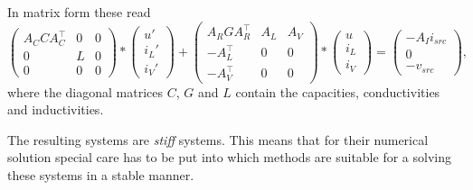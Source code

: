 In matrix form these read
\begin{equation}
	\label{MNA_Matrixform}
	\begin{pmatrix}
		A_C C A_C^\top & 0 & 0 \\
		0 & L & 0 \\
		0 & 0 & 0
	\end{pmatrix}
	*
	\begin{pmatrix}
		u' \\
		i_L' \\
		i_V'
	\end{pmatrix}
	+
	\begin{pmatrix}
		A_R G A_R^\top & A_L & A_V \\
		-A_L^\top & 0 & 0 \\
		-A_V^\top & 0 & 0 
	\end{pmatrix}
	*
	\begin{pmatrix}
		u \\
		i_L \\
		i_V
	\end{pmatrix}
	=
	\begin{pmatrix}
		-A_I i_{src} \\
		0 \\
		-v_{src}
	\end{pmatrix} , 
\end{equation}
where the diagonal matrices $C$, $G$ and $L$ contain the capacities, conductivities and inductivities.

The resulting systems are \emph{stiff} systems. This means that for their numerical solution special care has to be put into which methods are suitable for a solving these systems in a stable manner.


